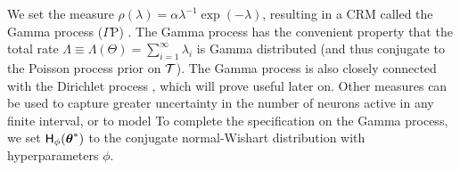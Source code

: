 We set the \Levy measure $\rho(\lambda) = \alpha \lambda^{-1}\exp(-\lambda)$,
resulting in a CRM called the Gamma process ($\Gamma$P) \citep{applebaum2004}. 
The Gamma process has the convenient property that the 
total rate $\Lambda \equiv \mathsf{\Lambda}(\Theta) = \sum_{i=1}^{\infty} \lambda_i$ is Gamma distributed (and thus conjugate to the Poisson process prior on $\mathcal{T}$).
The Gamma process is also closely connected with the Dirichlet process \citep{Ferguson73}, which will prove useful
later on.
Other \Levy measures can be used to capture greater uncertainty in the number of neurons active in any finite interval, or to model
To complete the specification on the Gamma process, %
we set $\mathsf{H}_{\phi}(\boldsymbol{\theta}^*)$ 
to the conjugate normal-Wishart distribution with hyperparameters $\phi$.

